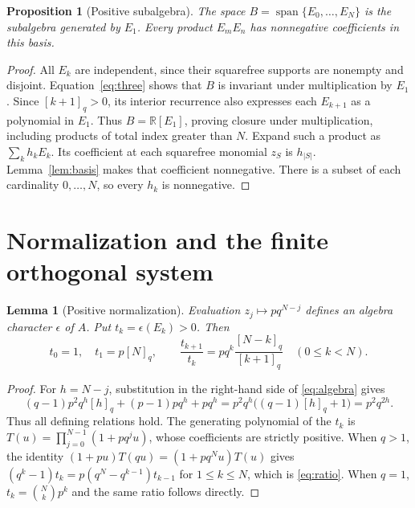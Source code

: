 \documentclass[11pt]{article}
\newtheorem{lemma}[theorem]{Lemma}
\newtheorem{proposition}[theorem]{Proposition}
\begin{document}
\begin{proposition}[Positive subalgebra]\label{prop:subalgebra}
The space $B=\operatorname{span}\{E_0,\ldots,E_N\}$ is the subalgebra generated by $E_1$. Every product $E_mE_n$ has nonnegative coefficients in this basis.
\end{proposition}
\begin{proof}
All $E_k$ are independent, since their squarefree supports are nonempty and disjoint. Equation~\eqref{eq:three} shows that $B$ is invariant under multiplication by $E_1$. Since $[k+1]_q>0$, its interior recurrence also expresses each $E_{k+1}$ as a polynomial in $E_1$. Thus $B=\mathbb R[E_1]$, proving closure under multiplication, including products of total index greater than $N$.
Expand such a product as $\sum_k h_kE_k$. Its coefficient at each squarefree monomial $z_S$ is $h_{|S|}$. Lemma~\ref{lem:basis} makes that coefficient nonnegative. There is a subset of each cardinality $0,\ldots,N$, so every $h_k$ is nonnegative.
\end{proof}

\section{Normalization and the finite orthogonal system}
\begin{lemma}[Positive normalization]\label{lem:normalization}
Evaluation $z_j\mapsto pq^{N-j}$ defines an algebra character $\epsilon$ of $A$. Put $t_k=\epsilon(E_k)>0$. Then
\begin{equation}\label{eq:ratio}
t_0=1,\quad t_1=p[N]_q,\qquad
\frac{t_{k+1}}{t_k}=pq^k\frac{[N-k]_q}{[k+1]_q}\quad(0\leq k<N).
\end{equation}
\end{lemma}
\begin{proof}
For $h=N-j$, substitution in the right-hand side of \eqref{eq:algebra} gives
\[
(q-1)p^2q^h[h]_q+(p-1)pq^h+pq^h
=p^2q^h\big((q-1)[h]_q+1\big)=p^2q^{2h}.
\]
Thus all defining relations hold. The generating polynomial of the $t_k$ is
$T(u)=\prod_{j=0}^{N-1}(1+pq^ju)$, whose coefficients are strictly positive.
When $q>1$, the identity $(1+pu)T(qu)=(1+pq^Nu)T(u)$ gives
$(q^k-1)t_k=p(q^N-q^{k-1})t_{k-1}$ for $1\leq k\leq N$, which is \eqref{eq:ratio}. When $q=1$, $t_k=\binom Nk p^k$ and the same ratio follows directly.
\end{proof}
\end{document}
